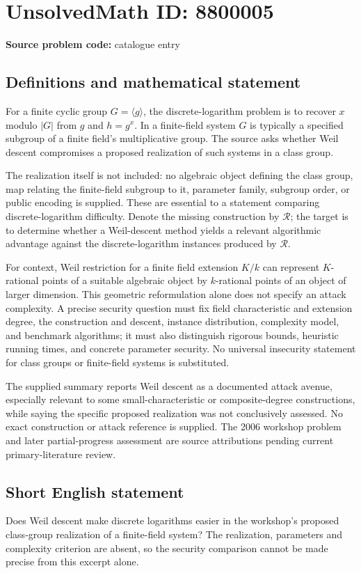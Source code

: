 \documentclass[11pt]{article}
\begin{document}
\section*{UnsolvedMath ID: 8800005}
\textbf{Source problem code:} catalogue entry
\subsection{Definitions and mathematical statement}
For a finite cyclic group \(G=\langle g\rangle\), the discrete-logarithm problem is to recover \(x\) modulo \(|G|\) from \(g\) and \(h=g^x\). In a finite-field system \(G\) is typically a specified subgroup of a finite field's multiplicative group. The source asks whether Weil descent compromises a proposed realization of such systems in a class group.

The realization itself is not included: no algebraic object defining the class group, map relating the finite-field subgroup to it, parameter family, subgroup order, or public encoding is supplied. These are essential to a statement comparing discrete-logarithm difficulty. Denote the missing construction by \(\mathcal R\); the target is to determine whether a Weil-descent method yields a relevant algorithmic advantage against the discrete-logarithm instances produced by \(\mathcal R\).

For context, Weil restriction for a finite field extension \(K/k\) can represent \(K\)-rational points of a suitable algebraic object by \(k\)-rational points of an object of larger dimension. This geometric reformulation alone does not specify an attack complexity. A precise security question must fix field characteristic and extension degree, the construction and descent, instance distribution, complexity model, and benchmark algorithms; it must also distinguish rigorous bounds, heuristic running times, and concrete parameter security. No universal insecurity statement for class groups or finite-field systems is substituted.

The supplied summary reports Weil descent as a documented attack avenue, especially relevant to some small-characteristic or composite-degree constructions, while saying the specific proposed realization was not conclusively assessed. No exact construction or attack reference is supplied. The 2006 workshop problem and later partial-progress assessment are source attributions pending current primary-literature review.
\subsection{Short English statement}
Does Weil descent make discrete logarithms easier in the workshop's proposed class-group realization of a finite-field system? The realization, parameters and complexity criterion are absent, so the security comparison cannot be made precise from this excerpt alone.
\end{document}
